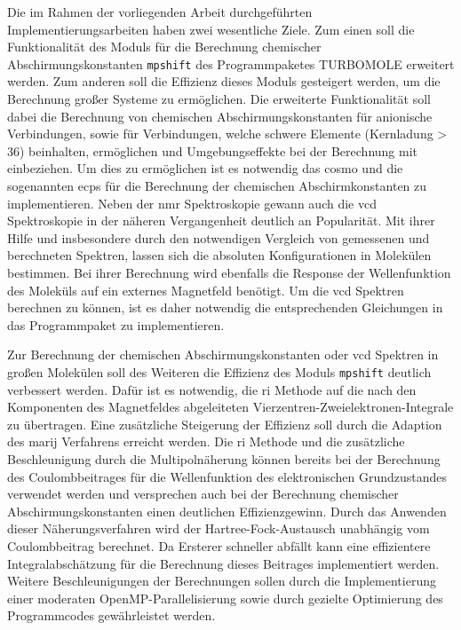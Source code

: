 \bigskip
Die im Rahmen der vorliegenden Arbeit durchgeführten Implementierungsarbeiten haben zwei wesentliche Ziele. Zum einen soll die Funktionalität des Moduls für die Berechnung chemischer Abschirmungskonstanten \texttt{mpshift}\supercite{haser1992direct,kollwitz1996direct} des Programmpaketes \textsc{TURBOMOLE}\supercite{ahlrichs1989electronic,TURBOMOLE,furche2014turbomole} erweitert werden. Zum anderen soll die Effizienz dieses Moduls gesteigert werden, um die Berechnung großer Systeme zu ermöglichen. Die erweiterte Funktionalität soll dabei die Berechnung von chemischen Abschirmungskonstanten für anionische Verbindungen, sowie für Verbindungen, welche schwere Elemente (Kernladung > 36) beinhalten, ermöglichen und Umgebungseffekte bei der Berechnung mit einbeziehen. Um dies zu ermöglichen ist es notwendig das \ac{cosmo}\supercite{klamt1993cosmo} und die sogenannten \acp{ecp} für die Berechnung der chemischen Abschirmkonstanten zu implementieren. Neben der \ac{nmr} Spektroskopie gewann auch die \ac{vcd} Spektroskopie in der näheren Vergangenheit deutlich an Popularität. Mit ihrer Hilfe und insbesondere durch den notwendigen Vergleich von gemessenen und berechneten Spektren, lassen sich die absoluten Konfigurationen in Molekülen bestimmen. Bei ihrer Berechnung wird ebenfalls die Response der Wellenfunktion des Moleküls auf ein externes Magnetfeld benötigt. Um die \ac{vcd} Spektren berechnen zu können, ist es daher notwendig die entsprechenden Gleichungen in das Programmpaket zu implementieren. 

Zur Berechnung der chemischen Abschirmungskonstanten oder \ac{vcd} Spektren in großen Molekülen soll des Weiteren die Effizienz des Moduls \texttt{mpshift} deutlich verbessert werden. Dafür ist es notwendig, die \ac{ri} Methode auf die nach den Komponenten des Magnetfeldes abgeleiteten Vierzentren-Zweielektronen-Integrale zu übertragen. Eine zusätzliche Steigerung der Effizienz soll durch die Adaption des \ac{marij} Verfahrens\supercite{sierka2003fast} erreicht werden. Die \ac{ri} Methode und die zusätzliche Beschleunigung durch die Multipolnäherung können bereits bei der Berechnung des Coulombbeitrages für die Wellenfunktion des elektronischen Grundzustandes verwendet werden und versprechen auch bei der Berechnung chemischer Abschirmungskonstanten einen deutlichen Effizienzgewinn. Durch das Anwenden dieser Näherungsverfahren wird der Hartree-Fock-Austausch unabhängig vom Coulombbeitrag berechnet. Da Ersterer schneller abfällt kann eine effizientere Integralabschätzung für die Berechnung dieses Beitrages implementiert werden. Weitere Beschleunigungen der Berechnungen sollen durch die Implementierung einer moderaten OpenMP-Parallelisierung sowie durch gezielte Optimierung des Programmcodes gewährleistet werden. 

